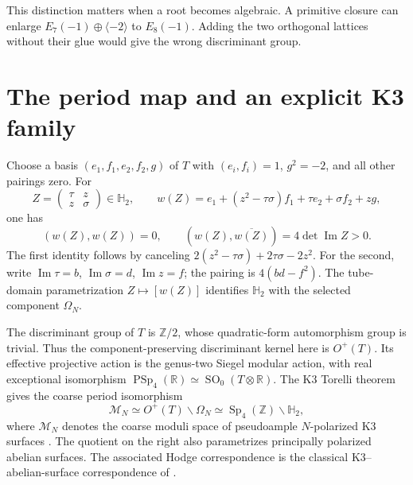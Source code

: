 This distinction matters when a root becomes algebraic. A primitive
closure can enlarge \(E_7(-1)\oplus\langle-2\rangle\) to
\(E_8(-1)\). Adding the two orthogonal lattices without their glue
would give the wrong discriminant group.

\section{The period map and an explicit K3 family}
\label{subsec:view4-period-coordinates}

Choose a basis \((e_1,f_1,e_2,f_2,g)\) of \(T\) with
\((e_i,f_i)=1\), \(g^2=-2\), and all other pairings zero.
For
\[
 Z=\begin{pmatrix}\tau&z\\z&\sigma\end{pmatrix}\in\mathbb H_2,
 \qquad
 w(Z)=e_1+(z^2-\tau\sigma)f_1+\tau e_2+\sigma f_2+zg,
\]
one has
\begin{equation}\label{eq:view4-period-vector}
 (w(Z),w(Z))=0,\qquad
 (w(Z),\overline{w(Z)})=4\det\operatorname{Im}Z>0.
\end{equation}
The first identity follows by canceling
\(2(z^2-\tau\sigma)+2\tau\sigma-2z^2\).
For the second, write \(\operatorname{Im}\tau=b\),
\(\operatorname{Im}\sigma=d\), \(\operatorname{Im}z=f\);
the pairing is \(4(bd-f^2)\).
The tube-domain parametrization \(Z\mapsto[w(Z)]\) identifies
\(\mathbb H_2\) with the selected component \(\Omega_N\).

The discriminant group of \(T\) is \(\mathbb Z/2\), whose
quadratic-form automorphism group is trivial. Thus the
component-preserving discriminant kernel here is \(O^+(T)\).
Its effective projective action is the genus-two Siegel modular
action, with real exceptional isomorphism
\(\operatorname{PSp}_4(\mathbb R)\simeq
\operatorname{SO}_0(T\otimes\mathbb R)\).
The K3 Torelli theorem gives the coarse period isomorphism
\begin{equation}\label{eq:view4-period-bridge}
 \mathcal M_N\simeq
 O^+(T)\backslash\Omega_N
 \simeq\operatorname{Sp}_4(\mathbb Z)\backslash\mathbb H_2,
\end{equation}
where \(\mathcal M_N\) denotes the coarse moduli space of
pseudoample \(N\)-polarized K3 surfaces
\cite[Proposition 3.1]{ClingherDoran2012}.
The quotient on the right also parametrizes principally polarized
abelian surfaces. The associated Hodge correspondence is the
classical K3--abelian-surface correspondence of
\cite[Proposition 3.2]{ClingherDoran2012}.

